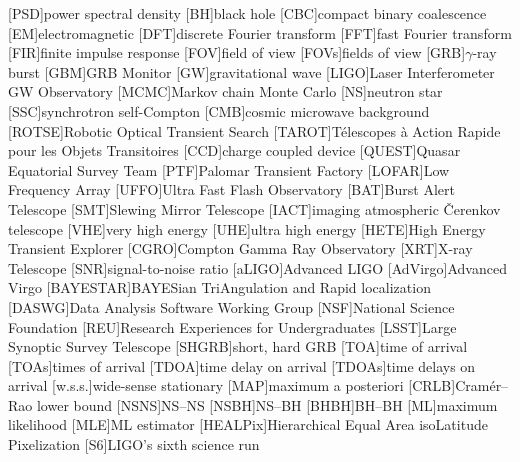 \usepackage{acronym}

[PSD]{power spectral density}
[BH]{black hole}
[CBC]{compact binary coalescence}
[EM]{electromagnetic}
[DFT]{discrete Fourier transform}
[FFT]{fast Fourier transform}
[FIR]{finite impulse response}
[FOV]{field of view}
[FOVs]{fields of view}
[GRB]{$\gamma$\nobreakdashes-ray burst}
[GBM]{\acl{GRB} Monitor}
[GW]{gravitational wave}
[LIGO]{Laser Interferometer \acs{GW} Observatory}
[MCMC]{Markov chain Monte Carlo}
[NS]{neutron star}
[SSC]{synchrotron self\nobreakdashes-Compton}
[CMB]{cosmic microwave background}
[ROTSE]{Robotic Optical Transient Search}
[TAROT]{T\'{e}lescopes \`{a} Action Rapide pour les Objets Transitoires}
[CCD]{charge coupled device}
[QUEST]{Quasar Equatorial Survey Team}
[PTF]{Palomar Transient Factory}
[LOFAR]{Low Frequency Array}
[UFFO]{Ultra Fast Flash Observatory}
[BAT]{Burst Alert Telescope}
[SMT]{Slewing Mirror Telescope}
[IACT]{imaging atmospheric \v{C}erenkov telescope}
[VHE]{very high energy}
[UHE]{ultra high energy}
[HETE]{High Energy Transient Explorer}
[CGRO]{Compton Gamma Ray Observatory}
[XRT]{X\nobreakdashes-ray Telescope}
[SNR]{signal\nobreakdashes-to\nobreakdashes-noise ratio}
[aLIGO]{Advanced \acs{LIGO}}
[AdVirgo]{Advanced Virgo}
[BAYESTAR]{BAYESian TriAngulation and Rapid localization}
[DASWG]{Data Analysis Software Working Group}
[NSF]{National Science Foundation}
[REU]{Research Experiences for Undergraduates}
[LSST]{Large Synoptic Survey Telescope}
[SHGRB]{short, hard \acl{GRB}}
[TOA]{time of arrival}
[TOAs]{times of arrival}
[TDOA]{time delay on arrival}
[TDOAs]{time delays on arrival}
[w.s.s.]{wide\nobreakdashes-sense stationary}
[MAP]{maximum a posteriori}
[CRLB]{Cram\'{e}r\nobreakdashes--Rao lower bound}
[NSNS]{\acl{NS}\nobreakdashes--\acl{NS}}
[NSBH]{\acl{NS}\nobreakdashes--\acl{BH}}
[BHBH]{\acl{BH}\nobreakdashes--\acl{BH}}
[ML]{maximum likelihood}
[MLE]{\ac{ML} estimator}
[HEALPix]{Hierarchical Equal Area isoLatitude Pixelization}
[S6]{\ac{LIGO}'s sixth science run}
